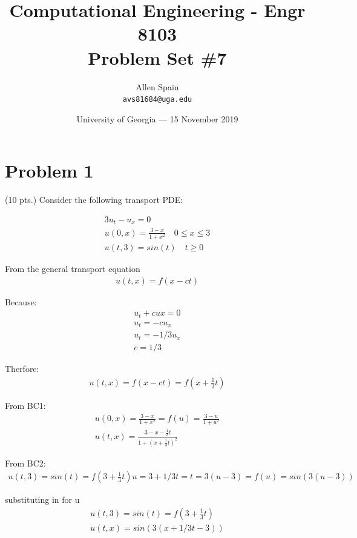\documentclass{article}
\title{Computational Engineering - Engr 8103 \\ Problem Set \#7} %
\author{Allen Spain\\ \texttt{avs81684@uga.edu}} %
\date{University of Georgia --- 15 November 2019 } %
\begin{document}
\maketitle %


\section*{Problem 1} %
(10 pts.) Consider the following transport PDE:

\begin{align*}
	3u_{t} - u_{x} = 0 \\
	u(0,x) = \frac{3-x}{1+x^{2}} \quad 0 \leq x \leq 3 \\
	u(t,3) = sin(t) \quad t \geq 0
\end{align*}

From the general transport equation
\begin{align*}
	u(t,x) = f(x-ct)
\end{align*}

Because:
\begin{align*}
	u_{t} + cu{x} = 0 \\
	u_{t} = -cu_{x} \\
	u_{t} = -1/3u_{x} \\
	c =  1/3
\end{align*}

Therfore:
\begin{align*}
u(t,x) = f(x-ct) = f(x+\frac{1}{3}t)
\end{align*}

From BC1:
\begin{align*}
u(0,x) = \frac{3-x}{1+x^2} = f(u) = \frac{3 - u}{1+u^{2}}\\
u(t,x)= \frac{3 - x - \frac{1}{3}t}{1+(x+\frac{1}{3}t)^2}
\end{align*}

From BC2:
\begin{align*}
u(t,3) = sin(t) = f(3 + \frac{1}{3}t)
u = 3 + 1/3t  =  t = 3(u - 3) = f(u) = sin(3(u - 3))
\end{align*}

substituting in for u
\begin{align*}
u(t,3) = sin(t) = f(3 + \frac{1}{3}t) \\
u(t,x) = sin(3(x + 1/3t - 3))
\end{align*}
\end{document}
